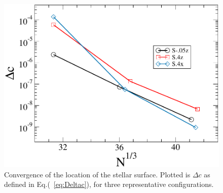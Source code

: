 \documentclass[aps,prd,amsmath,floatfix
,twocolumn
,superscriptaddress,nofootinbib,showpacs]{revtex4-1}
\theoremstyle{plain} \newtheorem{thm}{Theorem} \newtheorem{lem}{Lemma}
\begin{document}
\begin{figure}
\includegraphics[width=0.95\columnwidth]{ClmDif}
\caption{{\label{fig:ClmDif} Convergence of the location of the stellar surface}.
  Plotted is $\Delta c$ as defined in Eq.(~\ref{eq:Deltac}), for three representative configurations.}
\end{figure}
\end{document}
